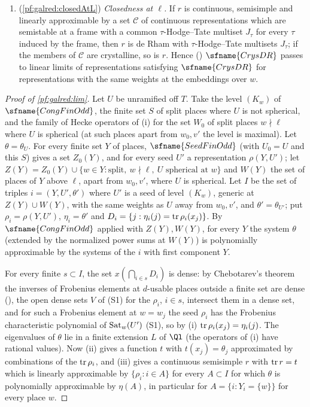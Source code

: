 \begin{enumerate}[label=(\roman*),nosep]
  every $\rho\in\mathcal C$ is trivial at $s$, then $r(s)=1$.
\item (\cref{pf:galred:closedAtL}) \emph{Closedness at $\ell$.} If $r$ is continuous, semisimple and
  linearly approximable by a set $\mathcal C$ of continuous representations which are semistable at a frame with a
  common $\tau$-Hodge--Tate multiset $J_\tau$ for every $\tau$ induced by the frame, then $r$ is de Rham with $\tau$-Hodge--Tate
  multisets $J_\tau$; if the members of $\mathcal C$ are crystalline, so is $r$. Hence
  () $\sfname{CrysDR}$ passes to linear limits of representations
  satisfying $\sfname{CrysDR}$ for representations with the same weights at the embeddings over $w$.
\end{enumerate}

\begin{proof}[Proof of \cref{pf:galred:lim}]
Let $U$ be unramified off $T$. Take the level $(K_w)$ of $\sfname{CongFinOdd}$, the finite set $S$ of split places where
$U$ is not spherical, and the family of Hecke operators of (i) for the set
$W_0$ of split places $w\nmid\ell$ where $U$ is spherical (at such places apart from $w_0,v'$ the level is maximal). Let
$\theta=\theta_U$. For every finite set $Y$ of places, $\sfname{SeedFinOdd}$ (with $U_0=U$ and this $S$) gives a set
$Z_0(Y)$, and for every seed $U'$ a representation $\rho(Y,U')$; let $Z(Y)=Z_0(Y)\cup\{w\in Y:\text{split},\ w\nmid\ell,\ U
\text{ spherical at }w\}$ and $W(Y)$ the set of places of $Y$ above $\ell$, apart from $w_0,v'$, where $U$ is spherical. Let
$I$ be the set of triples $i=(Y,U',\theta')$ where $U'$ is a seed of level $(K_w)$, generic at $Z(Y)\cup W(Y)$, with the same
weights as $U$ away from $w_0,v'$, and $\theta'=\theta_{U'}$; put $\rho_i=\rho(Y,U')$, $\eta_i=\theta'$ and $D_i=\{j:
\eta_i(j)=\operatorname{tr}\rho_i(x_j)\}$. By $\sfname{CongFinOdd}$ applied with $Z(Y),W(Y)$, for every $Y$ the system $\theta$
(extended by the normalized power sums at $W(Y)$) is polynomially approximable by the systems of the $i$ with first
component $Y$.

For every finite $s\subset I$, the set $x(\bigcap_{i\in s}D_i)$ is dense: by Chebotarev's theorem the inverses of Frobenius
elements at $d$-usable places outside a finite set are dense (),
the open dense sets $V$ of (S1) for the $\rho_i$, $i\in s$,
intersect them in a dense set, and for such a Frobenius element at $w=w_j$ the seed $\rho_i$ has the Frobenius characteristic
polynomial of $\operatorname{Sat}_w(U')$ (S1), so by (i) $\operatorname{tr}\rho_i(x_j)=\eta_i(j)$. The eigenvalues of $\theta$ lie in a finite
extension $L$ of $\Ql$ (the operators of (i) have rational values). Now (ii) gives a function $t$ with $t(x_j)=\theta_j$
approximated by combinations of the $\operatorname{tr}\rho_i$, and (iii) gives a continuous semisimple $r$ with $\operatorname{tr} r=t$ which is
linearly approximable by $\{\rho_i:i\in A\}$ for every $A\subset I$ for which $\theta$ is polynomially approximable by $\eta(A)$, in
particular for $A=\{i:Y_i=\{w\}\}$ for every place $w$.


\end{proof}
